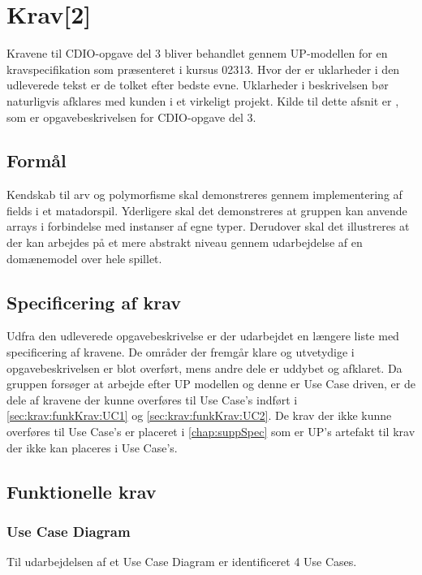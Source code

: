 \chapter{Krav[2]}\label{chap:krav}
Kravene til CDIO-opgave del 3 bliver behandlet gennem UP-modellen for en kravspecifikation som præsenteret i kursus 02313. Hvor der er uklarheder i den udleverede tekst er de tolket efter bedste evne. Uklarheder i beskrivelsen bør naturligvis afklares med kunden i et virkeligt projekt. Kilde til dette afsnit er \cite{CDIOdel3}, som er opgavebeskrivelsen for CDIO-opgave del 3.

\section{Formål}\label{sec:krav:formål}
Kendskab til arv og polymorfisme skal demonstreres gennem implementering af fields i et matadorspil. Yderligere skal det demonstreres at gruppen kan anvende arrays i forbindelse med instanser af egne typer. Derudover skal det illustreres at der kan arbejdes på et mere abstrakt niveau gennem udarbejdelse af en domænemodel over hele spillet. 

\section{Specificering af krav}\label{sec:krav:kravSpec}
Udfra den udleverede opgavebeskrivelse \cite{CDIOdel3} er der udarbejdet en længere liste med specificering af kravene. De områder der fremgår klare og utvetydige i opgavebeskrivelsen er blot overført, mens andre dele er uddybet og afklaret. Da gruppen forsøger at arbejde efter UP modellen og denne er Use Case driven, er de dele af kravene der kunne overføres til Use Case's indført i \vref{sec:krav:funkKrav:UC1} og \vref{sec:krav:funkKrav:UC2}. De krav der ikke kunne overføres til Use Case's er placeret i \vref{chap:suppSpec} som er UP's artefakt til krav der ikke kan placeres i Use Case's.
 
\section{Funktionelle krav}\label{sec:krav:funkKrav}
\subsection{Use Case Diagram}\label{sec:krav:funkKrav:useCaseDia}
Til udarbejdelsen af et Use Case Diagram er identificeret 4 Use Cases. 

